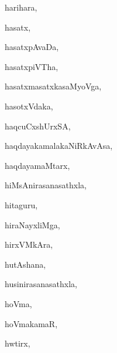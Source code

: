 \begin{multicols}{2}
{harihara}, \pageref{harihara}

{hasatx}, \pageref{hasatx}

{hasatxpAvaDa}, \pageref{hasatxpAvaDa}

{hasatxpiVTha}, \pageref{hasatxpiVTha}

{hasatxmasatxkasaMyoVga}, \pageref{hasatxmasatxkasaMyoVga}

{hasotxVdaka}, \pageref{hasotxVdaka}

{haqcuCxshUrxSA}, \pageref{haqcuCxshUrxSA}

{haqdayakamalakaNiRkAvAsa}, \pageref{haqdayakamalakaNiRkAvAsa}

{haqdayamaMtarx}, \pageref{haqdayamaMtarx}

{hiMsAnirasanasathxla}, \pageref{hiMsAnirasanasathxla}

{hitaguru}, \pageref{hitaguru}

{hiraNayxliMga}, \pageref{hiraNayxliMga}

{hirxVMkAra}, \pageref{hirxVMkAra}

{hutAshana}, \pageref{hutAshana}

{husinirasanasathxla}, \pageref{husinirasanasathxla}

{hoVma}, \pageref{hoVma}

{hoVmakamaR}, \pageref{hoVmakamaR}

{hwtirx}, \pageref{hwtirx}

\end{multicols}
